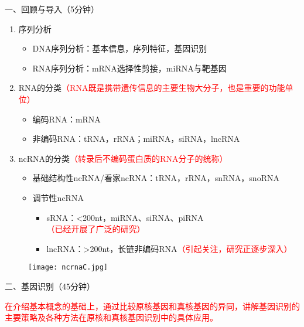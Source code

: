 \documentclass{TIJMUjiaoanLL}
\begin{document}
\noindent
一、回顾与导入（5分钟）
\begin{enumerate}
  \item 序列分析
    \begin{itemize}
      \item DNA序列分析：基本信息，序列特征，基因识别
      \item RNA序列分析：mRNA选择性剪接，miRNA与靶基因
    \end{itemize}
  \item
    RNA的分类\textcolor{red}{（RNA既是携带遗传信息的主要生物大分子，也是重要的功能单位）}
    \begin{itemize}
      \item 编码RNA：mRNA
      \item 非编码RNA：tRNA，rRNA；miRNA，siRNA，lncRNA
    \end{itemize}
  \item ncRNA的分类\textcolor{red}{（转录后不编码蛋白质的RNA分子的统称）}
    \begin{itemize}
      \item 基础结构性ncRNA/看家ncRNA：tRNA，rRNA，snRNA，snoRNA
      \item 调节性ncRNA
      \begin{itemize}
	\item sRNA：\textless 200nt，miRNA、siRNA、piRNA\textcolor{red}{（已经开展了广泛的研究）}
        \item lncRNA：\textgreater 200nt，长链非编码RNA\textcolor{red}{（引起关注，研究正逐步深入）}
      \end{itemize}
    \end{itemize}
\end{enumerate}
\vspace*{-10pt}
\begin{figure}[h]
  \centering
  \texttt{[image: ncrnaC.jpg]}
\end{figure}
\vspace*{-10pt}

\vspace*{0.2cm}
\noindent
二、基因识别（45分钟）

\textcolor{red}{在介绍基本概念的基础上，通过比较原核基因和真核基因的异同，讲解基因识别的主要策略及各种方法在原核和真核基因识别中的具体应用。}
\end{document}
